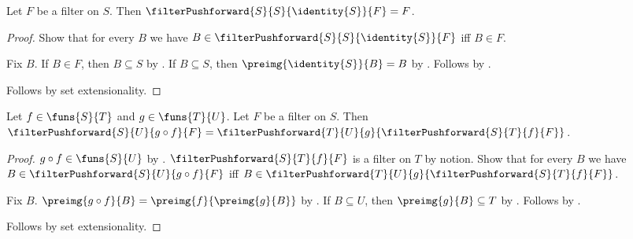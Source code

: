 \begin{theorem}\label{identity_filter_pushforward}
    Let $F$ be a filter on $S$.
    Then $\filterPushforward{S}{S}{\identity{S}}{F}=F$.
\end{theorem}
\begin{proof}
    Show that for every $B$ we have
        $B\in\filterPushforward{S}{S}{\identity{S}}{F}$ iff $B\in F$.
    \begin{subproof}
        Fix $B$.
        If $B\in F$, then $B\subseteq S$ by .
        If $B\subseteq S$, then
            $\preimg{\identity{S}}{B}=B$ by
            .
        Follows by .
    \end{subproof}
    Follows by set extensionality.
\end{proof}

\begin{theorem}\label{composition_filter_pushforward}
    Let $f\in\funs{S}{T}$ and $g\in\funs{T}{U}$.
    Let $F$ be a filter on $S$.
    Then $\filterPushforward{S}{U}{g\circ f}{F}
        =\filterPushforward{T}{U}{g}{\filterPushforward{S}{T}{f}{F}}$.
\end{theorem}
\begin{proof}
    $g\circ f\in\funs{S}{U}$ by .
    $\filterPushforward{S}{T}{f}{F}$ is a filter on $T$ by notion.
    Show that for every $B$ we have
        $B\in\filterPushforward{S}{U}{g\circ f}{F}$ iff
        $B\in\filterPushforward{T}{U}{g}{
            \filterPushforward{S}{T}{f}{F}}$.
    \begin{subproof}
        Fix $B$.
        $\preimg{g\circ f}{B}=\preimg{f}{\preimg{g}{B}}$ by
            .
        If $B\subseteq U$, then $\preimg{g}{B}\subseteq T$ by
            .
        Follows by .
    \end{subproof}
    Follows by set extensionality.
\end{proof}

